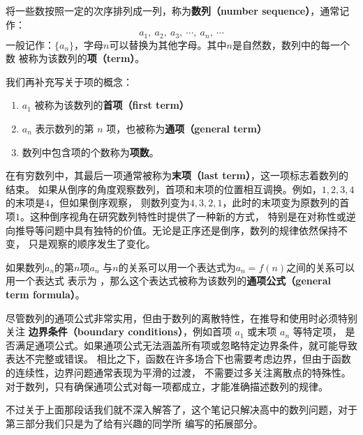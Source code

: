 \documentclass[a5paper]{article}
\begin{document}
将一些数按照一定的次序排列成一列，称为\textbf{数列（number sequence）}，通常记作：
\begin{equation*}
    a_1,~a_2,~a_3,~\cdots ,~a_n,~\cdots
\end{equation*}
一般记作：$\{a_n\}$，字母$n$可以替换为其他字母。其中$n$是自然数，数列中的每一个数
被称为该数列的\textbf{项（term）}。

\newpage
我们再补充写关于项的概念：
\begin{enumerate}
    \item $a_1$ 被称为该数列的\textbf{首项（first term）}
    \item $a_n$ 表示数列的第 $n$ 项，也被称为\textbf{通项（general term）}
    \item 数列中包含项的个数称为\textbf{项数}。
\end{enumerate}

在有穷数列中，其最后一项通常被称为\textbf{末项（last term）}，这一项标志着数列的结束。
如果从倒序的角度观察数列，首项和末项的位置相互调换。例如，$1,2,3,4$的末项是$4$，但如果倒序观察，
则数列变为$4,3,2,1$，此时的末项变为原数列的首项$1$。这种倒序视角在研究数列特性时提供了一种新的方式，
特别是在对称性或逆向推导等问题中具有独特的价值。无论是正序还是倒序，数列的规律依然保持不变，
只是观察的顺序发生了变化。

如果数列$a_n$的第$n$项$a_n$ 与$n$的关系可以用一个表达式为$a_n = f(n)$之间的关系可以用一个表达式
表示为 ，那么这个表达式被称为该数列的\textbf{通项公式（general term formula）}。

尽管数列的通项公式非常实用，但由于数列的离散特性，在推导和使用时必须特别关注
\textbf{边界条件（boundary conditions）}，例如首项 $a_1$ 或末项 $a_n$ 等特定项，
是否满足通项公式。如果通项公式无法涵盖所有项或忽略特定边界条件，就可能导致表达不完整或错误。
相比之下，函数在许多场合下也需要考虑边界，但由于函数的连续性，边界问题通常表现为平滑的过渡，
不需要过多关注离散点的特殊性。对于数列，只有确保通项公式对每一项都成立，才能准确描述数列的规律。

不过关于上面那段话我们就不深入解答了，这个笔记只解决高中的数列问题，对于第三部分我们只是为了给有兴趣的同学所
编写的拓展部分。





% 

% 
\end{document}
